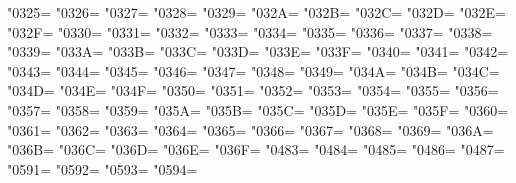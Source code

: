 \XeTeXcharclass"0325=\KclassCM
\XeTeXcharclass"0326=\KclassCM
\XeTeXcharclass"0327=\KclassCM
\XeTeXcharclass"0328=\KclassCM
\XeTeXcharclass"0329=\KclassCM
\XeTeXcharclass"032A=\KclassCM
\XeTeXcharclass"032B=\KclassCM
\XeTeXcharclass"032C=\KclassCM
\XeTeXcharclass"032D=\KclassCM
\XeTeXcharclass"032E=\KclassCM
\XeTeXcharclass"032F=\KclassCM
\XeTeXcharclass"0330=\KclassCM
\XeTeXcharclass"0331=\KclassCM
\XeTeXcharclass"0332=\KclassCM
\XeTeXcharclass"0333=\KclassCM
\XeTeXcharclass"0334=\KclassCM
\XeTeXcharclass"0335=\KclassCM
\XeTeXcharclass"0336=\KclassCM
\XeTeXcharclass"0337=\KclassCM
\XeTeXcharclass"0338=\KclassCM
\XeTeXcharclass"0339=\KclassCM
\XeTeXcharclass"033A=\KclassCM
\XeTeXcharclass"033B=\KclassCM
\XeTeXcharclass"033C=\KclassCM
\XeTeXcharclass"033D=\KclassCM
\XeTeXcharclass"033E=\KclassCM
\XeTeXcharclass"033F=\KclassCM
\XeTeXcharclass"0340=\KclassCM
\XeTeXcharclass"0341=\KclassCM
\XeTeXcharclass"0342=\KclassCM
\XeTeXcharclass"0343=\KclassCM
\XeTeXcharclass"0344=\KclassCM
\XeTeXcharclass"0345=\KclassCM
\XeTeXcharclass"0346=\KclassCM
\XeTeXcharclass"0347=\KclassCM
\XeTeXcharclass"0348=\KclassCM
\XeTeXcharclass"0349=\KclassCM
\XeTeXcharclass"034A=\KclassCM
\XeTeXcharclass"034B=\KclassCM
\XeTeXcharclass"034C=\KclassCM
\XeTeXcharclass"034D=\KclassCM
\XeTeXcharclass"034E=\KclassCM
\XeTeXcharclass"034F=\KclassCM
\XeTeXcharclass"0350=\KclassCM
\XeTeXcharclass"0351=\KclassCM
\XeTeXcharclass"0352=\KclassCM
\XeTeXcharclass"0353=\KclassCM
\XeTeXcharclass"0354=\KclassCM
\XeTeXcharclass"0355=\KclassCM
\XeTeXcharclass"0356=\KclassCM
\XeTeXcharclass"0357=\KclassCM
\XeTeXcharclass"0358=\KclassCM
\XeTeXcharclass"0359=\KclassCM
\XeTeXcharclass"035A=\KclassCM
\XeTeXcharclass"035B=\KclassCM
\XeTeXcharclass"035C=\KclassCM
\XeTeXcharclass"035D=\KclassCM
\XeTeXcharclass"035E=\KclassCM
\XeTeXcharclass"035F=\KclassCM
\XeTeXcharclass"0360=\KclassCM
\XeTeXcharclass"0361=\KclassCM
\XeTeXcharclass"0362=\KclassCM
\XeTeXcharclass"0363=\KclassCM
\XeTeXcharclass"0364=\KclassCM
\XeTeXcharclass"0365=\KclassCM
\XeTeXcharclass"0366=\KclassCM
\XeTeXcharclass"0367=\KclassCM
\XeTeXcharclass"0368=\KclassCM
\XeTeXcharclass"0369=\KclassCM
\XeTeXcharclass"036A=\KclassCM
\XeTeXcharclass"036B=\KclassCM
\XeTeXcharclass"036C=\KclassCM
\XeTeXcharclass"036D=\KclassCM
\XeTeXcharclass"036E=\KclassCM
\XeTeXcharclass"036F=\KclassCM
\XeTeXcharclass"0483=\KclassCM
\XeTeXcharclass"0484=\KclassCM
\XeTeXcharclass"0485=\KclassCM
\XeTeXcharclass"0486=\KclassCM
\XeTeXcharclass"0487=\KclassCM
\XeTeXcharclass"0591=\KclassCM
\XeTeXcharclass"0592=\KclassCM
\XeTeXcharclass"0593=\KclassCM
\XeTeXcharclass"0594=\KclassCM
